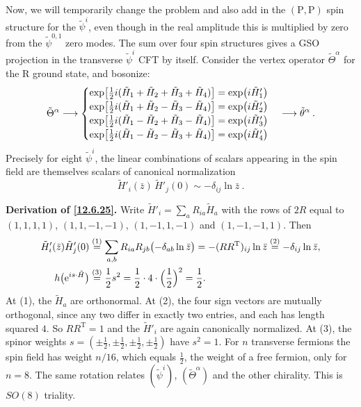 Now, we will temporarily change the problem and also add in the $(\mathrm{P},\mathrm{P})$ spin structure for the $\tilde{\psi}^i$, even though in the real amplitude this is multiplied by zero from the $\tilde{\psi}^{0,1}$ zero modes. The sum over four spin structures gives a GSO projection in the transverse $\tilde{\psi}^i$ CFT by itself. Consider the vertex operator $\tilde{\Theta}^\alpha$ for the R ground state, and bosonize:
\begin{equation}
	\tilde{\Theta}^\alpha \longrightarrow \begin{cases}
		\exp\bigl[\frac{1}{2}i(\tilde{H}_1 + \tilde{H}_2 + \tilde{H}_3 + \tilde{H}_4)\bigr] = \exp(i\tilde{H}'_1) \\
		\exp\bigl[\frac{1}{2}i(\tilde{H}_1 + \tilde{H}_2 - \tilde{H}_3 - \tilde{H}_4)\bigr] = \exp(i\tilde{H}'_2) \\
		\exp\bigl[\frac{1}{2}i(\tilde{H}_1 - \tilde{H}_2 + \tilde{H}_3 - \tilde{H}_4)\bigr] = \exp(i\tilde{H}'_3) \\
		\exp\bigl[\frac{1}{2}i(\tilde{H}_1 - \tilde{H}_2 - \tilde{H}_3 + \tilde{H}_4)\bigr] = \exp(i\tilde{H}'_4)
	\end{cases} \longrightarrow \tilde{\theta}^\alpha \:. \label{12.6.24}
\end{equation}
Precisely for eight $\tilde{\psi}^i$, the linear combinations of scalars appearing in the spin field are themselves scalars of canonical normalization
\begin{equation}
	\tilde{H}'_i(\bar{z})\,\tilde{H}'_j(0) \sim -\delta_{ij}\ln\bar{z} \:. \label{12.6.25}
\end{equation}
\begin{tcolorbox}[breakable]
	\begin{remark}
		\textbf{Derivation of \eqref{12.6.25}.} Write $\tilde H'_{i}=\sum_{a}R_{ia}\tilde H_{a}$ with the rows of $2R$ equal to $(1,1,1,1)$, $(1,1,-1,-1)$, $(1,-1,1,-1)$ and $(1,-1,-1,1)$. Then
		\begin{align*}
			\tilde H'_{i}(\bar z)\tilde H'_{j}(0)&\overset{(1)}{=} \sum_{a,b}R_{ia}R_{jb}\bigl(-\delta_{ab}\ln\bar z\bigr)=-(RR^{\mathrm T})_{ij}\ln\bar z
			\overset{(2)}{=} -\delta_{ij}\ln\bar z ,\\
			h\bigl(\mathrm{e}^{i s\cdot\tilde H}\bigr)&\overset{(3)}{=} \frac12 s^{2}=\frac12\cdot4\cdot\Bigl(\frac12\Bigr)^{2}=\frac12 .
		\end{align*}
		At (1), the $\tilde H_{a}$ are orthonormal. At (2), the four sign vectors are mutually orthogonal, since any two differ in exactly two entries, and each has length squared $4$. So $RR^{\mathrm T}=1$ and the $\tilde H'_{i}$ are again canonically normalized. At (3), the spinor weights $s=(\pm\frac12,\pm\frac12,\pm\frac12,\pm\frac12)$ have $s^{2}=1$. For $n$ transverse fermions the spin field has weight $n/16$, which equals $\frac12$, the weight of a free fermion, only for $n=8$. The same rotation relates $(\tilde\psi^{i})$, $(\tilde\Theta^{\alpha})$ and the other chirality. This is $SO(8)$ triality.
	\end{remark}
\end{tcolorbox}
